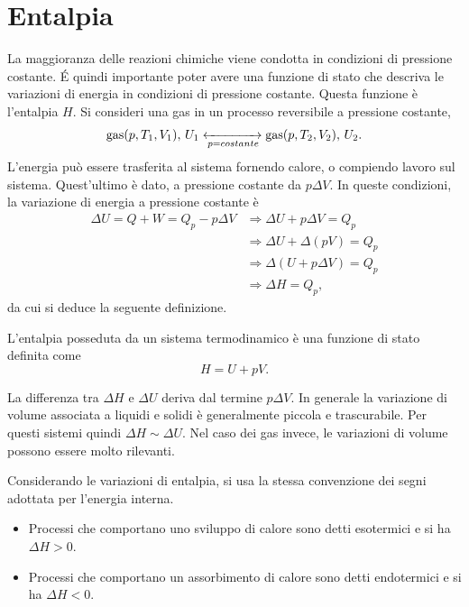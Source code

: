 \section{Entalpia}
La maggioranza delle reazioni chimiche viene condotta in condizioni di pressione costante. \'E quindi importante poter avere una funzione di stato che descriva le variazioni di energia in condizioni di pressione costante. Questa funzione è l'entalpia $H$. Si consideri una gas in un processo reversibile a pressione costante,
\begin{equation}
    \text{gas}(p,T_1,V_1),\,U_1\xleftrightarrow[p=costante]{}\text{gas}(p,T_2,V_2),\,U_2.
\end{equation}
L'energia può essere trasferita al sistema fornendo calore, o compiendo lavoro sul sistema. Quest'ultimo è dato, a pressione costante da $p\Delta V$. In queste condizioni, la variazione di energia a pressione costante è
\begin{equation}
    \begin{split}
        \Delta U=Q+W=Q_p-p\Delta V&\Rightarrow\Delta U+p\Delta V=Q_p \\
        &\Rightarrow\Delta U+\Delta(pV)=Q_p \\
        &\Rightarrow\Delta(U+p\Delta V)=Q_p \\
        &\Rightarrow\Delta H=Q_p,
    \end{split}
\end{equation}
da cui si deduce la seguente definizione.
\begin{defn}[entalpia]
    L'entalpia posseduta da un sistema termodinamico è una funzione di stato definita come 
    \begin{equation}
        H=U+pV.
    \end{equation}
\end{defn}
\begin{obs}
    La differenza tra $\Delta H$ e $\Delta U$
deriva dal termine $p\Delta V$. In generale la variazione di volume associata a liquidi e solidi è generalmente piccola e trascurabile. Per questi sistemi quindi $\Delta H\sim\Delta U$. Nel caso dei gas invece, le variazioni di volume possono essere molto rilevanti.
\end{obs}
Considerando le variazioni di entalpia, si usa la stessa convenzione dei segni adottata per l'energia interna.
\newpage
\begin{notz}\hfill
    \begin{itemize}
        \item Processi che comportano uno sviluppo di calore sono detti esotermici e si ha $\Delta H>0$.
        \item Processi che comportano un assorbimento di calore sono detti endotermici e si ha $\Delta H<0$.
    \end{itemize}
\end{notz}
